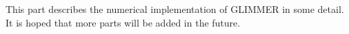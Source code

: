 This part describes the numerical implementation of GLIMMER in some detail. It is hoped that more parts will be added in the future.



